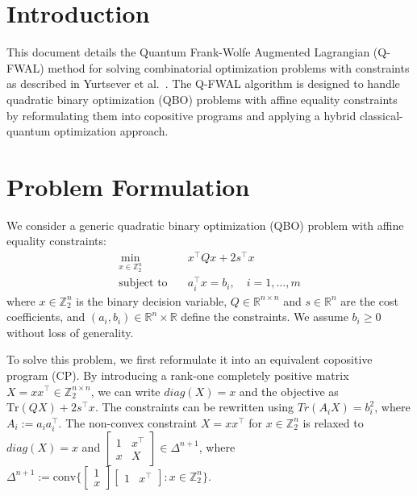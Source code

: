 \documentclass{article}
\begin{document}
\section{Introduction}

This document details the Quantum Frank-Wolfe Augmented Lagrangian (Q-FWAL) method for solving combinatorial optimization problems with constraints as described in Yurtsever et al.\ \cite{yurtsever2022qfw}. The Q-FWAL algorithm is designed to handle quadratic binary optimization (QBO) problems with affine equality constraints by reformulating them into copositive programs and applying a hybrid classical-quantum optimization approach.

\section{Problem Formulation}

We consider a generic quadratic binary optimization (QBO) problem with affine equality constraints:
\begin{align}
\min_{x \in \mathbb{Z}_2^n} \quad & x^\top Q x + 2 s^\top x \nonumber \\
\text{subject to} \quad & a_i^\top x = b_i, \quad i = 1, \dots, m \label{eq:qbo}
\end{align}
where $x \in \mathbb{Z}_2^n$ is the binary decision variable, $Q \in \mathbb{R}^{n \times n}$ and $s \in \mathbb{R}^n$ are the cost coefficients, and $(a_i, b_i) \in \mathbb{R}^n \times \mathbb{R}$ define the constraints. We assume $b_i \ge 0$ without loss of generality.

To solve this problem, we first reformulate it into an equivalent copositive program (CP). By introducing a rank-one completely positive matrix $X = x x^\top \in \mathbb{Z}_2^{n \times n}$, we can write $diag(X) = x$ and the objective as $\text{Tr}(QX) + 2s^\top x$. The constraints can be rewritten using $Tr(A_i X) = b_i^2$, where $A_i := a_i a_i^\top$. The non-convex constraint $X = xx^\top$ for $x \in \mathbb{Z}_2^n$ is relaxed to $diag(X) = x$ and $\begin{bmatrix} 1 & x^\top \\ x & X \end{bmatrix} \in \Delta^{n+1}$, where $\Delta^{n+1} := \text{conv}\{ \begin{bmatrix} 1 \\ x \end{bmatrix} \begin{bmatrix} 1 & x^\top \end{bmatrix} : x \in \mathbb{Z}_2^n \}$.
\end{document}

